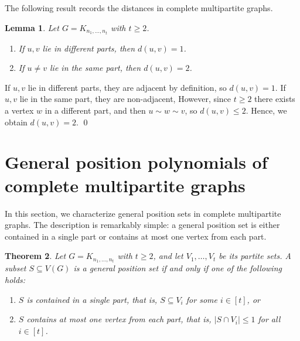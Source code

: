 \documentclass[12pt,twoside]{article}
\newtheorem{theorem}{Theorem}[section]
\newtheorem{lemma}[theorem]{Lemma}
\renewenvironment{proof}{{\noindent\bfseries Proof.}}{\qed}
\begin{document}
	The following result records the distances in complete multipartite graphs.
	\begin{lemma}\label{lem:distances}
		Let \(G=K_{n_1,\dots,n_t}\) with \(t\ge 2\).
		\begin{enumerate}
			\item If \(u,v\) lie in different parts, then \(d(u,v)=1\).
			\item If \(u\neq v\) lie in the same part, then \(d(u,v)=2\).
		\end{enumerate}
	\end{lemma}
	
	\begin{proof}
		If \(u,v\) lie in different parts, they are adjacent by definition, so \(d(u,v)=1\). If \(u,v\) lie in the same part, they are non-adjacent, However, since \(t\ge 2\) there exists a vertex \(w\) in a different part, and then \(u\sim w\sim v\), so \(d(u,v)\le 2\). Hence, we obtain \(d(u,v)=2\).
	\end{proof}
	
\section{General position polynomials of complete multipartite graphs}\label{sec:polynomial}
	
	In this section, we characterize general position sets in complete multipartite graphs. The description is remarkably simple: a general position set is either contained in a single part or contains at most one vertex from each part.
	
	\begin{theorem}\label{thm:structure-gpsets}
		Let \(G=K_{n_1,\dots,n_t}\) with \(t\ge 2\), and let \(V_1,\dots,V_t\) be its partite sets. A subset \(S\subseteq V(G)\) is a general position set if and only if one of the following holds:
		\begin{enumerate}
			\item[(A)] \(S\) is contained in a single part, that is, \(S\subseteq V_i\) for some \(i\in[t]\), or
			\item[(B)] \(S\) contains at most one vertex from each part, that is,  \(|S\cap V_i|\le 1\) for all \(i\in[t]\).
		\end{enumerate}
	\end{theorem}
	
\end{document}
